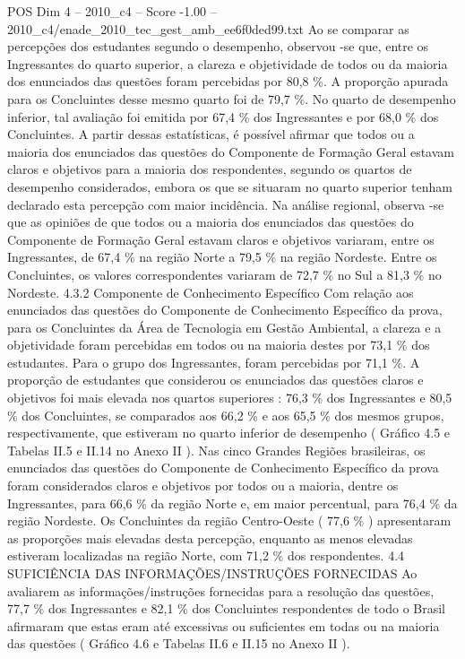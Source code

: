 \begin{textsample}{POS Dim 4 – 2010\_c4 – Score -1.00 – 2010\_c4/enade\_2010\_tec\_gest\_amb\_ee6f0ded99.txt}
Ao se comparar as percepções dos estudantes segundo o desempenho, observou -se que, entre os Ingressantes do quarto superior, a clareza e objetividade de todos ou da maioria dos enunciados das questões foram percebidas por 80,8 \%.
A proporção apurada para os Concluintes desse mesmo quarto foi de 79,7 \%.
No quarto de desempenho inferior, tal avaliação foi emitida por 67,4 \% dos Ingressantes e por 68,0 \% dos Concluintes.
A partir dessas estatísticas, é possível afirmar que todos ou a maioria dos enunciados das questões do Componente de Formação Geral estavam claros e objetivos para a maioria dos respondentes, segundo os quartos de desempenho considerados, embora os que se situaram no quarto superior tenham declarado esta percepção com maior incidência.
Na análise regional, observa -se que as opiniões de que todos ou a maioria dos enunciados das questões do Componente de Formação Geral estavam claros e objetivos variaram, entre os Ingressantes, de 67,4 \% na região Norte a 79,5 \% na região Nordeste.
Entre os Concluintes, os valores correspondentes variaram de 72,7 \% no Sul a 81,3 \% no Nordeste. 4.3.2 Componente de Conhecimento Específico Com relação aos enunciados das questões do Componente de Conhecimento Específico da prova, para os Concluintes da Área de Tecnologia em Gestão Ambiental, a clareza e a objetividade foram percebidas em todos ou na maioria destes por 73,1 \% dos estudantes.
Para o grupo dos Ingressantes, foram percebidas por 71,1 \%.
A proporção de estudantes que considerou os enunciados das questões claros e objetivos foi mais elevada nos quartos superiores : 76,3 \% dos Ingressantes e 80,5 \% dos Concluintes, se comparados aos 66,2 \% e aos 65,5 \% dos mesmos grupos, respectivamente, que estiveram no quarto inferior de desempenho ( Gráfico 4.5 e Tabelas II.5 e II.14 no Anexo II ).
Nas cinco Grandes Regiões brasileiras, os enunciados das questões do Componente de Conhecimento Específico da prova foram considerados claros e objetivos por todos ou a maioria, dentre os Ingressantes, para 66,6 \% da região Norte e, em maior percentual, para 76,4 \% da região Nordeste.
Os Concluintes da região Centro-Oeste ( 77,6 \% ) apresentaram as proporções mais elevadas desta percepção, enquanto as menos elevadas estiveram localizadas na região Norte, com 71,2 \% dos respondentes. 4.4 SUFICIÊNCIA DAS INFORMAÇÕES/INSTRUÇÕES FORNECIDAS Ao avaliarem as informações/instruções fornecidas para a resolução das questões, 77,7 \% dos Ingressantes e 82,1 \% dos Concluintes respondentes de todo o Brasil afirmaram que estas eram até excessivas ou suficientes em todas ou na maioria das questões ( Gráfico 4.6 e Tabelas II.6 e II.15 no Anexo II ).

\end{textsample}
